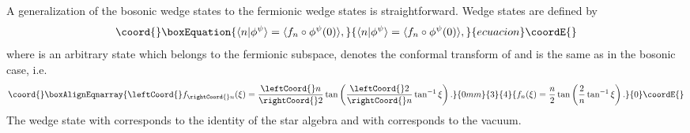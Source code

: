 \documentclass[a4paper,12pt]{article}
\begin{document}
A generalization of the bosonic wedge states
\cite{zwiebach,RSZF} to the fermionic wedge states is
straightforward.
Wedge states \coordHE{} are defined by
\begin{equation}\coord{}\boxEquation{
\langle n|\phi^{\psi}\rangle=\langle f_{n}\circ\phi^{\psi}(0)\rangle,
}{
\langle n|\phi^{\psi}\rangle=\langle f_{n}\circ\phi^{\psi}(0)\rangle,
}{ecuacion}\coordE{}\end{equation}
where \myHighlight{$|\phi^{\psi}\rangle$}\coordHE{} is an arbitrary state which belongs to
the fermionic subspace, \coordHE{} denotes the
conformal transform of \myHighlight{$\phi^{\psi}(\xi)$}\coordHE{} and \coordHE{} is
the same as in the bosonic case, i.e.
\begin{gather}\coord{}\boxAlignEqnarray{
\leftCoord{}f_{\rightCoord{}n}(\xi)=\frac{\leftCoord{}n}{\rightCoord{}2}\tan\left(\frac{\leftCoord{}2}{\rightCoord{}n}\tan^{-1}\xi\right).\label{wedge-map}
}{0mm}{3}{4}{
f_{n}(\xi)=\frac{n}{2}\tan\left(\frac{2}{n}\tan^{-1}\xi\right).}{0}\coordE{}\end{gather}
The wedge state with \coordHE{} corresponds to the identity of the star
algebra and with \coordHE{} corresponds to the vacuum.
\end{document}
